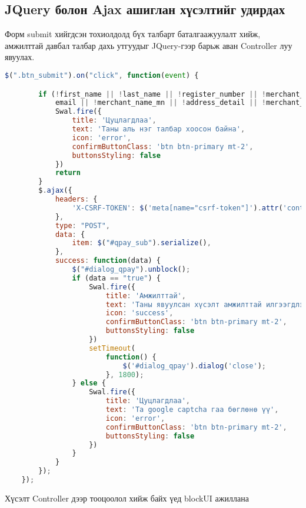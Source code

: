 \subsection{JQuery болон Ajax ашиглан хүсэлтийг удирдах}
 Форм submit хийгдсэн тохиолдолд бүх талбарт баталгаажуулалт хийж, амжилттай давбал талбар дахь утгуудыг JQuery-гээр барьж аван Controller луу явуулах. 
\begin{lstlisting}[language=Javascript, caption=JQuery catching form values, frame=single]
	$(".btn_submit").on("click", function(event) {

        if (!first_name || !last_name || !register_number || !merchant_app_phone_number || !
            email || !merchant_name_mn || !address_detail || !merchant_name_en) {
            Swal.fire({
                title: 'Цуцлагдлаа',
                text: 'Таны аль нэг талбар хоосон байна',
                icon: 'error',
                confirmButtonClass: 'btn btn-primary mt-2',
                buttonsStyling: false
            })
            return
        }
        $.ajax({
            headers: {
                'X-CSRF-TOKEN': $('meta[name="csrf-token"]').attr('content')
            },
            type: "POST",
            data: {
                item: $("#qpay_sub").serialize(),
            },
            success: function(data) {
                $("#dialog_qpay").unblock();
                if (data == "true") {
                    Swal.fire({
                        title: 'Амжилттай',
                        text: 'Таны явуулсан хүсэлт амжилттай илгээгдлээ',
                        icon: 'success',
                        confirmButtonClass: 'btn btn-primary mt-2',
                        buttonsStyling: false
                    })
                    setTimeout(
                        function() {
                            $('#dialog_qpay').dialog('close');
                        }, 1800);
                } else {
                    Swal.fire({
                        title: 'Цуцлагдлаа',
                        text: 'Та google captcha гаа бөглөнө үү',
                        icon: 'error',
                        confirmButtonClass: 'btn btn-primary mt-2',
                        buttonsStyling: false
                    })
                }
            }
        });
    });
\end{lstlisting}

Хүсэлт Controller дээр тооцоолол хийж байх үед blockUI ажиллана

